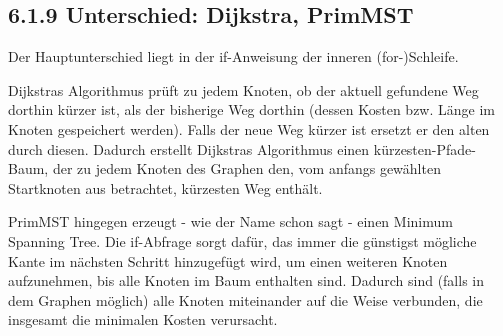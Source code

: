\subsection*{6.1.9 Unterschied: Dijkstra, PrimMST}

Der Hauptunterschied liegt in der if-Anweisung der inneren (for-)Schleife.

Dijkstras Algorithmus prüft zu jedem Knoten, ob der aktuell gefundene Weg dorthin kürzer ist, als der bisherige Weg dorthin (dessen Kosten bzw. Länge im Knoten gespeichert werden). Falls der neue Weg kürzer ist ersetzt er den alten durch diesen. Dadurch erstellt Dijkstras Algorithmus einen kürzesten-Pfade-Baum, der zu jedem Knoten des Graphen den, vom anfangs gewählten Startknoten aus betrachtet, kürzesten Weg enthält.

PrimMST hingegen erzeugt - wie der Name schon sagt - einen Minimum Spanning Tree. Die if-Abfrage sorgt dafür, das immer die günstigst mögliche Kante im nächsten Schritt hinzugefügt wird, um einen weiteren Knoten aufzunehmen, bis alle Knoten im Baum enthalten sind. Dadurch sind (falls in dem Graphen möglich) alle Knoten miteinander auf die Weise verbunden, die insgesamt die minimalen Kosten verursacht.